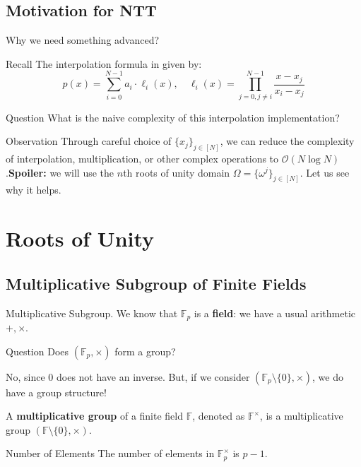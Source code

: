 \documentclass{zkdl-presentation-template}
\begin{document}
    \subsection{Motivation for NTT}
    \begin{frame}{Why we need something advanced?}
        \begin{block}{Recall}
            The interpolation formula in given by:
            \begin{equation*}
                p(x) = \sum_{i=0}^{N-1} a_i \cdot \ell_i(x), \quad \ell_i(x) = \prod_{j=0, j \neq i}^{N-1} \frac{x - x_j}{x_i - x_j}
            \end{equation*}
        \end{block}

        \pause\begin{alertblock}{Question}
            What is the naive complexity of this interpolation implementation?\pause
        \end{alertblock}

        \begin{block}{Observation}
            Through careful choice of $\{x_j\}_{j \in [N]}$, we can reduce the
            complexity of interpolation, multiplication, or other complex
            operations to $\mathcal{O}(N \log N)$.\pause \textbf{Spoiler:} we will use
            the $n$th roots of unity domain $\Omega = \{\omega^j\}_{j \in [N]}$.
            Let us see why it helps.
        \end{block}
    \end{frame}

    \section{Roots of Unity}
    \subsection{Multiplicative Subgroup of Finite Fields}
    \begin{frame}{Multiplicative Subgroup.}
        We know that $\mathbb{F}_p$ is a \textbf{field}: we have a usual arithmetic $+,\times$.\pause

        \begin{alertblock}{Question}
            Does $(\mathbb{F}_p, \times)$ form a group?\pause
        \end{alertblock}

        No, since $0$ does not have an inverse. But, if we consider
        $(\mathbb{F}_p \setminus \{0\}, \times)$, we do have a group structure!\pause

        \begin{definition}
            A \textbf{multiplicative group} of a finite field $\mathbb{F}$, denoted as $\mathbb{F}^{\times}$, is a multiplicative group $(\mathbb{F} \setminus \{0\}, \times)$.\pause
        \end{definition}

        \begin{block}{Number of Elements}
            The number of elements in $\mathbb{F}^{\times}_p$ is $p - 1$. 
        \end{block}
    \end{frame}
\end{document}
